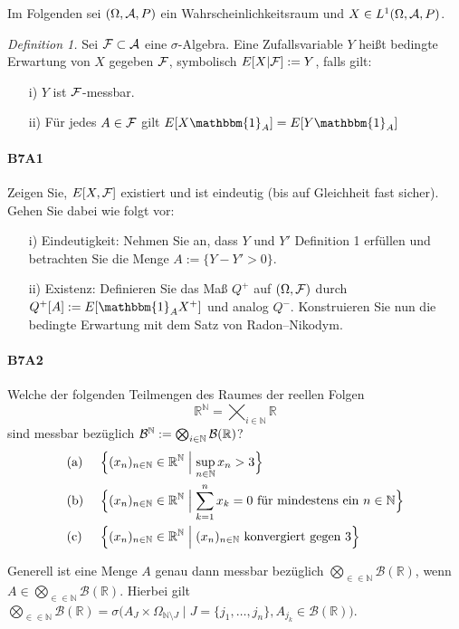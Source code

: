\documentclass{article}
\begin{document}
Im Folgenden sei $(\Omega,{\cal A},P)$ ein Wahrscheinlichkeitsraum und $X\in L^1(\Omega,{\cal A},P)$.

\emph{Definition 1.} Sei ${\cal F}\subset{\cal A}$ eine $\sigma$-Algebra.
Eine Zufallsvariable $Y$ heißt bedingte Erwartung von $X$ gegeben ${\cal F}$, symbolisch $E[X|{\cal F}]:=Y$, falls gilt:
\begin{itemize}
\item[i)] $Y$ ist ${\cal F}$-messbar.
\item[ii)] Für jedes $A\in{\cal F}$ gilt $E[X\mathbbm{1}_A]=E[Y\mathbbm{1}_A]$
\end{itemize}
\paragraph{B7A1}
Zeigen Sie, $E[X,{\cal F}]$ existiert und ist eindeutig (bis auf Gleichheit fast sicher).
Gehen Sie dabei wie folgt vor:
\begin{itemize}
\item[i)] Eindeutigkeit: Nehmen Sie an, dass $Y$ und $Y'$ Definition 1 erfüllen und betrachten Sie die Menge $A:=\{Y-Y'>0\}$.
\item[ii)] Existenz: Definieren Sie das Maß $Q^+$ auf $(\Omega,{\cal F})$ durch $Q^+[A]:=E[\mathbbm{1}_AX^+]$ und analog $Q^-$.
  Konstruieren Sie nun die bedingte Erwartung mit dem Satz von Radon--Nikodym.
\end{itemize}
\newpage

\paragraph{B7A2}
Welche der folgenden Teilmengen des Raumes der reellen Folgen
\[
\mathbb{R}^\mathbb{N}=\bigtimes_{i\in\mathbb{N}}\mathbb{R}
\]
sind messbar bezüglich ${\cal B}^\mathbb{N}:=\bigotimes_{i\in\mathbb{N}}{\cal B}(\mathbb{R})$?
\begin{alignat*}{2}
  &\text{(a)}~&&\Bigl\{(x_n)_{n\in\mathbb{N}}\in\mathbb{R}^{\mathbb{N}}\Bigm|\sup_{n\in\mathbb{N}}x_n>3\Bigr\}\\
  &\text{(b)}~&&\Bigl\{(x_n)_{n\in\mathbb{N}}\in\mathbb{R}^{\mathbb{N}}\Bigm|\sum_{k=1}^nx_k=0\text{ für mindestens ein $n\in\mathbb{N}$}\Bigr\}\\
  &\text{(c)}~&&\Bigl\{(x_n)_{n\in\mathbb{N}}\in\mathbb{R}^{\mathbb{N}}\Bigm|(x_n)_{n\in\mathbb{N}}\text{ konvergiert gegen 3}\Bigr\}
\end{alignat*}

Generell ist eine Menge $A$ genau dann messbar bezüglich $\bigotimes_{\in\in\mathbb{N}}\mathcal{B}(\mathbb{R})$, wenn $A\in\bigotimes_{\in\in\mathbb{N}}\mathcal{B}(\mathbb{R})$.
Hierbei gilt $\bigotimes_{\in\in\mathbb{N}}\mathcal{B}(\mathbb{R})=\sigma\bigl(A_J\times\Omega_{\mathbb{N}\setminus J}\mid J=\{j_1,\dots,j_n\},A_{j_k}\in\mathcal{B}(\mathbb{R})\bigr)$.
\newpage
\end{document}
